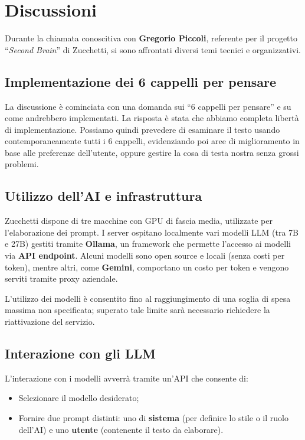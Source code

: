 \documentclass[a4paper,12pt]{article}
\begin{document}
\section{Discussioni}

Durante la chiamata conoscitiva con \textbf{Gregorio Piccoli}, referente per il progetto “\textit{Second Brain}” di Zucchetti, si sono affrontati diversi temi tecnici e organizzativi.

\subsection{Implementazione dei 6 cappelli per pensare}
La discussione è cominciata con una domanda sui “6 cappelli per pensare” e su come andrebbero implementati. La risposta è stata che abbiamo completa libertà di implementazione. Possiamo quindi prevedere di esaminare il testo usando contemporaneamente tutti i 6 cappelli, evidenziando poi aree di miglioramento in base alle preferenze dell’utente, oppure gestire la cosa di testa nostra senza grossi problemi.

\subsection{Utilizzo dell'AI e infrastruttura}
Zucchetti dispone di tre macchine con GPU di fascia media, utilizzate per l’elaborazione dei prompt.  
I server ospitano localmente vari modelli LLM (tra 7B e 27B) gestiti tramite \textbf{Ollama}, un framework che permette l’accesso ai modelli via \textbf{API endpoint}.  
Alcuni modelli sono open source e locali (senza costi per token), mentre altri, come \textbf{Gemini}, comportano un costo per token e vengono serviti tramite proxy aziendale.  

L’utilizzo dei modelli è consentito fino al raggiungimento di una soglia di spesa massima non specificata; superato tale limite sarà necessario richiedere la riattivazione del servizio.

\subsection{Interazione con gli LLM}
L’interazione con i modelli avverrà tramite un’API che consente di:
\begin{itemize}
    \item Selezionare il modello desiderato;
    \item Fornire due prompt distinti: uno di \textbf{sistema} (per definire lo stile o il ruolo dell’AI) e uno \textbf{utente} (contenente il testo da elaborare).
\end{itemize}
\end{document}
